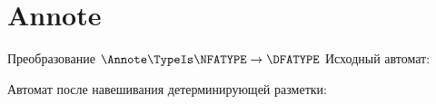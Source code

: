 \section{Annote}
\begin{frame}{Преобразование $\Annote\TypeIs\NFATYPE\to\DFATYPE$}
	Исходный автомат:


	Автомат после навешивания детерминирующей разметки:


\end{frame}
